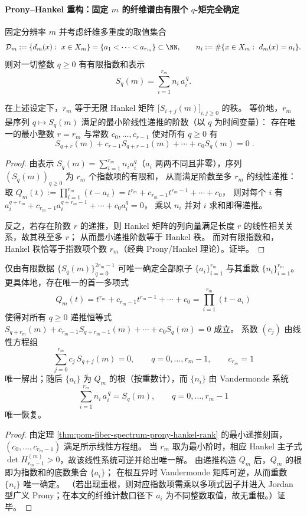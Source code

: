 \paragraph{Prony--Hankel 重构：固定 \(m\) 的纤维谱由有限个 \(q\)-矩完全确定}
固定分辨率 \(m\) 并考虑纤维多重度的取值集合
\[
\mathcal{D}_m:=\{d_m(x):\ x\in X_m\}=\{a_1<\cdots<a_{r_m}\}\subset\NN,
\qquad
n_i:=\#\{x\in X_m:\ d_m(x)=a_i\}.
\]
则对一切整数 \(q\ge 0\) 有有限指数和表示
\[
S_q(m)=\sum_{i=1}^{r_m} n_i\,a_i^{\,q}.
\]

\begin{theorem}\label{thm:pom-fiber-spectrum-prony-hankel-rank}
在上述设定下，\(r_m\) 等于无限 Hankel 矩阵 \(\bigl[S_{i+j}(m)\bigr]_{i,j\ge 0}\) 的秩。
等价地，\(r_m\) 是序列 \(q\mapsto S_q(m)\) 满足的最小阶线性递推的阶数（以 \(q\) 为时间变量）：
存在唯一的最小整数 \(r=r_m\) 与常数 \(c_0,\dots,c_{r-1}\) 使对所有 \(q\ge 0\) 有
\[
\boxed{\;
S_{q+r}(m)+c_{r-1}S_{q+r-1}(m)+\cdots+c_0 S_q(m)=0\; }.
\]
\end{theorem}
\begin{proof}
由表示 \(S_q(m)=\sum_{i=1}^{r_m}n_i a_i^q\)（\(a_i\) 两两不同且非零），序列 \((S_q(m))_{q\ge 0}\) 为 \(r_m\) 个指数项的有限和，
从而满足阶数至多 \(r_m\) 的线性递推：取
\(
Q_m(t):=\prod_{i=1}^{r_m}(t-a_i)=t^{r_m}+c_{r_m-1}t^{r_m-1}+\cdots+c_0
\)，
则对每个 \(i\) 有 \(a_i^{q+r_m}+c_{r_m-1}a_i^{q+r_m-1}+\cdots+c_0 a_i^q=0\)，
乘以 \(n_i\) 并对 \(i\) 求和即得递推。
\par
反之，若存在阶数 \(r\) 的递推，则 Hankel 矩阵的列向量满足长度 \(r\) 的线性相关关系，故其秩至多 \(r\)；
从而最小递推阶数等于 Hankel 秩。
而对有限指数和，Hankel 秩恰等于指数项个数 \(r_m\)（经典 Prony/Hankel 理论）。证毕。
\end{proof}

\begin{theorem}\label{thm:pom-fiber-spectrum-prony-hankel-2r-reconstruction}
仅由有限数据 \(\{S_q(m)\}_{q=0}^{2r_m-1}\) 可唯一确定全部原子 \(\{a_i\}_{i=1}^{r_m}\) 与其重数 \(\{n_i\}_{i=1}^{r_m}\)。
更具体地，存在唯一的首一多项式
\[
Q_m(t)=t^{r_m}+c_{r_m-1}t^{r_m-1}+\cdots+c_0=\prod_{i=1}^{r_m}(t-a_i)
\]
使得对所有 \(q\ge 0\) 递推恒等式
\(
S_{q+r_m}(m)+c_{r_m-1}S_{q+r_m-1}(m)+\cdots+c_0S_q(m)=0
\)
成立。
系数 \((c_j)\) 由线性方程组
\[
\sum_{j=0}^{r_m} c_j\,S_{q+j}(m)=0,\qquad q=0,\dots,r_m-1,\qquad c_{r_m}=1
\]
唯一解出；随后 \(\{a_i\}\) 为 \(Q_m\) 的根（按重数计），而 \(\{n_i\}\) 由 Vandermonde 系统
\[
\sum_{i=1}^{r_m} n_i\,a_i^{\,q}=S_q(m),\qquad q=0,\dots,r_m-1
\]
唯一恢复。
\end{theorem}
\begin{proof}
由定理 \ref{thm:pom-fiber-spectrum-prony-hankel-rank} 的最小递推刻画，
\((c_0,\dots,c_{r_m-1})\) 满足所示线性方程组。
当 \(r_m\) 取为最小阶时，相应 Hankel 主子式 \(\det H^{(m)}_{r_m-1}>0\)，故该线性系统可逆并给出唯一解。
由递推构造 \(Q_m\) 后，\(Q_m\) 的根即为指数和的底数集合 \(\{a_i\}\)；
在根互异时 Vandermonde 矩阵可逆，从而重数 \(\{n_i\}\) 唯一确定。
（若出现重根，则对应指数项需乘以多项式因子并进入 Jordan 型广义 Prony；在本文的纤维计数口径下 \(a_i\) 为不同整数取值，故无重根。）证毕。
\end{proof}

